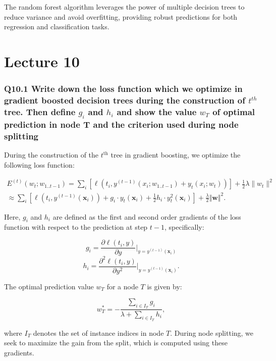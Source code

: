 \documentclass[11pt]{article}
\begin{document}
The random forest algorithm leverages the power of multiple decision trees to reduce variance and avoid overfitting, providing robust predictions for both regression and classification tasks.

\part{Lecture 10}

\section{Q10.1 Write down the loss function which we optimize in gradient boosted decision trees during the construction of $t^{th}$ tree. Then define $g_i$ and $h_i$ and show the value $w_T$ of optimal prediction in node T and the criterion used during node splitting}

During the construction of the $t^{\text{th}}$ tree in gradient boosting, we optimize the following loss function:

\begin{align*}
E^{(t)}(w_t; w_{1..t-1}) = \sum_{i} \left[ \ell(t_i, y^{(t-1)}(x_i; w_{1..t-1}) + y_t(x_i; w_t)) \right] + \frac{1}{2}\lambda \|w_t\|^2 \\
\approx \sum_{i} \left[ \ell (t_i, y^{(t-1)}(\mathbf{x}_i)) + g_i \cdot y_t(\mathbf{x}_i) + \frac{1}{2} h_i \cdot y_t^2(\mathbf{x}_i) \right] + \frac{\lambda}{2} \Vert \mathbf{w} \Vert^2.
\end{align*}

Here, $g_i$ and $h_i$ are defined as the first and second order gradients of the loss function with respect to the prediction at step $t-1$, specifically:

\begin{equation}
g_i = \frac{\partial \ell(t_i, y)}{\partial y} \bigg|_{y = y^{(t-1)}(\mathbf{x}_i)}
\end{equation}
\begin{equation}
h_i = \frac{\partial^2 \ell(t_i, y)}{\partial y^2} \bigg|_{y = y^{(t-1)}(\mathbf{x}_i)}.
\end{equation}

The optimal prediction value $w_T$ for a node $T$ is given by:

\begin{equation}
w_T^* = - \frac{\sum_{i \in I_T} g_i}{\lambda + \sum_{i \in I_T} h_i},
\end{equation}

where $I_T$ denotes the set of instance indices in node $T$. During node splitting, we seek to maximize the gain from the split, which is computed using these gradients.
\end{document}
